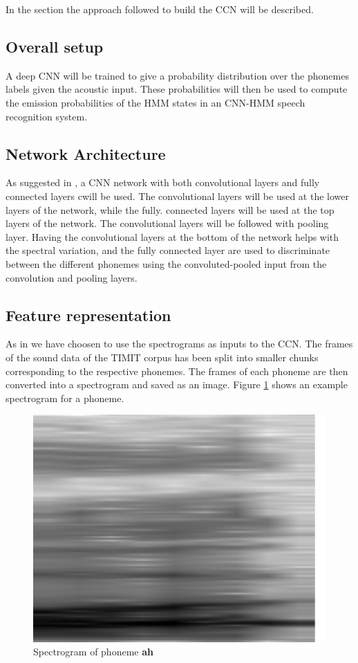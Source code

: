 In the section the approach followed to build the CCN will be described.
\subsection{Overall setup}
A deep CNN will be trained to give a probability distribution over the phonemes labels given the acoustic input. These probabilities will then be used to compute the emission probabilities of the HMM states in an CNN-HMM speech recognition system.
\subsection{Network Architecture}
As suggested in \cite{sainath2013deep}, a CNN network with both convolutional layers and fully connected layers cwill be used. The convolutional layers will be used at the lower layers of the network, while the fully. connected layers will be used at the top layers of the network. The convolutional layers will be followed with pooling layer. Having the convolutional layers at the bottom of the network helps with the spectral variation, and the fully connected layer are used to discriminate between the different phonemes using the convoluted-pooled input from the convolution and pooling layers.
\subsection{Feature representation}
As in \cite{graves2014towards} we have choosen to use the spectrograms as inputs to the CCN. The frames of the sound data of the  TIMIT corpus has been split into smaller chunks corresponding to the respective phonemes. The frames of each phoneme are then converted into a spectrogram and saved as an image. Figure \ref{fig:spect} shows an example spectrogram for a phoneme.
\begin{figure}[H]
\centering
\includegraphics[width=1\linewidth]{figs/ah.png}
\caption{Spectrogram of phoneme \textbf{ah}}
\label{fig:spect}
\end{figure}
